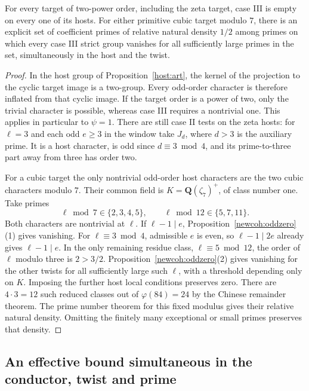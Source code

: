 \begin{corollary}\label{famsel:hostdensity}
For every target of two-power order, including the zeta target,
case III is empty on every one of its hosts. For either primitive
cubic target modulo \(7\), there is an explicit set of coefficient
primes of relative natural density \(1/2\) among primes on which
every case III strict group vanishes for all sufficiently large
primes in the set, simultaneously in the host and the twist.
\end{corollary}
\begin{proof}
In the host group of Proposition~\ref{host:art}, the kernel of
the projection to the cyclic target image is a two-group. Every
odd-order character is therefore inflated from that cyclic image.
If the target order is a power of two, only the trivial character
is possible, whereas case III requires a nontrivial one. This
applies in particular to \(\psi=1\). There are still case II tests
on the zeta hosts: for \(\ell=3\) and each odd \(e\ge3\) in the
window take \(J_d\), where \(d>3\) is the auxiliary prime.
It is a host character, is odd since \(d\equiv3\bmod4\), and its
prime-to-three part away from three has order two.

For a cubic target the only nontrivial odd-order host characters
are the two cubic characters modulo \(7\). Their common field is
\(K=\mathbf Q(\zeta_7)^+\), of class number one. Take primes
\[
    \ell\bmod 7\in\{2,3,4,5\},\qquad
    \ell\bmod 12\in\{5,7,11\}.
\]
Both characters are nontrivial at \(\ell\). If \(\ell-1\mid e\),
Proposition~\ref{newcoh:oddzero}(1) gives vanishing. For
\(\ell\equiv3\bmod4\), admissible \(e\) is even, so
\(\ell-1\mid 2e\) already gives \(\ell-1\mid e\).
In the only remaining residue class, \(\ell\equiv5\bmod12\),
the order of \(\ell\) modulo three is \(2>3/2\).
Proposition~\ref{newcoh:oddzero}(2) gives vanishing for the other
twists for all sufficiently large such \(\ell\), with a threshold
depending only on \(K\). Imposing the further host local conditions
preserves zero. There are \(4\cdot3=12\) such reduced classes
out of \(\varphi(84)=24\) by the Chinese remainder theorem.
The prime number theorem for this fixed modulus gives their
relative natural density. Omitting the finitely many exceptional
or small primes preserves that density.
\end{proof}

\subsection{An effective bound simultaneous in the conductor, twist and prime}

